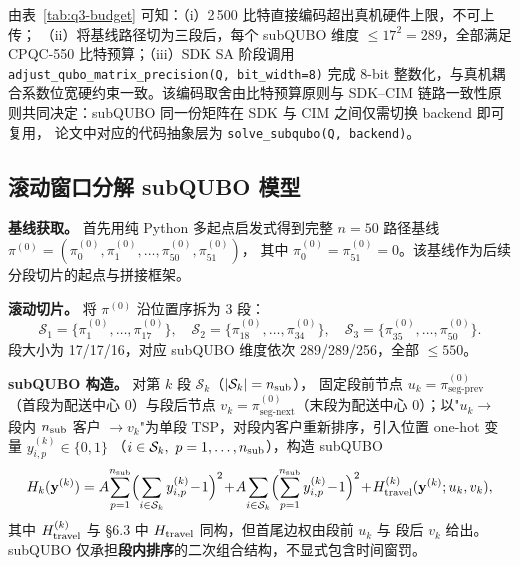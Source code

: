 \documentclass[UTF8,12pt,a4paper]{ctexart}
\begin{document}
由表~\ref{tab:q3-budget} 可知：（i）2\,500 比特直接编码超出真机硬件上限，不可上传；
（ii）将基线路径切为三段后，每个 subQUBO 维度 $\le 17^{2}=289$，全部满足 CPQC-550
比特预算；（iii）SDK SA 阶段调用 \texttt{adjust\_qubo\_matrix\_precision(Q, bit\_width=8)}
完成 8-bit 整数化，与真机耦合系数位宽硬约束一致。该编码取舍由比特预算原则与 SDK--CIM
链路一致性原则共同决定：subQUBO 同一份矩阵在 SDK 与 CIM 之间仅需切换 backend 即可复用，
论文中对应的代码抽象层为 \texttt{solve\_subqubo(Q, backend)}。

\subsection{滚动窗口分解 subQUBO 模型}
\label{subsec:q3-decomp}

\textbf{基线获取。} 首先用纯 Python 多起点启发式得到完整 $n=50$ 路径基线
$\pi^{(0)} = (\pi_0^{(0)},\pi_1^{(0)},\dots,\pi_{50}^{(0)},\pi_{51}^{(0)})$，
其中 $\pi_0^{(0)}=\pi_{51}^{(0)}=0$。该基线作为后续分段切片的起点与拼接框架。

\textbf{滚动切片。} 将 $\pi^{(0)}$ 沿位置序拆为 3 段：
\begin{equation}
\label{eq:q3-segments}
\mathcal{S}_1 = \{\pi_1^{(0)},\dots,\pi_{17}^{(0)}\},\quad
\mathcal{S}_2 = \{\pi_{18}^{(0)},\dots,\pi_{34}^{(0)}\},\quad
\mathcal{S}_3 = \{\pi_{35}^{(0)},\dots,\pi_{50}^{(0)}\}.
\end{equation}
段大小为 17/17/16，对应 subQUBO 维度依次 289/289/256，全部 $\le 550$。

\textbf{subQUBO 构造。} 对第 $k$ 段 $\mathcal{S}_k$（$|\mathcal{S}_k|=n_{\rm sub}$），
固定段前节点 $u_k = \pi^{(0)}_{\text{seg-prev}}$（首段为配送中心 0）与段后节点
$v_k = \pi^{(0)}_{\text{seg-next}}$（末段为配送中心 0）；以"$u_k\to$ 段内 $n_{\rm sub}$ 客户
$\to v_k$"为单段 TSP，对段内客户重新排序，引入位置 one-hot 变量 $y_{i,p}^{(k)}\in\{0,1\}$
（$i\in\mathcal{S}_k,\ p=1,\dots,n_{\rm sub}$），构造 subQUBO
\begin{equation}
\label{eq:q3-subqubo}
H_k(\mathbf{y}^{(k)}) = A\!\sum_{p=1}^{n_{\rm sub}}\!\Big(\!\sum_{i\in\mathcal{S}_k} y_{i,p}^{(k)}\!-\!1\Big)^{2}
\!+\! A\!\sum_{i\in\mathcal{S}_k}\!\Big(\!\sum_{p=1}^{n_{\rm sub}} y_{i,p}^{(k)}\!-\!1\Big)^{2}
\!+\! H_{\rm travel}^{(k)}(\mathbf{y}^{(k)};u_k,v_k),
\end{equation}
其中 $H_{\rm travel}^{(k)}$ 与 §6.3 中 $H_{\rm travel}$ 同构，但首尾边权由段前 $u_k$ 与
段后 $v_k$ 给出。subQUBO 仅承担\textbf{段内排序}的二次组合结构，不显式包含时间窗罚。
\end{document}

